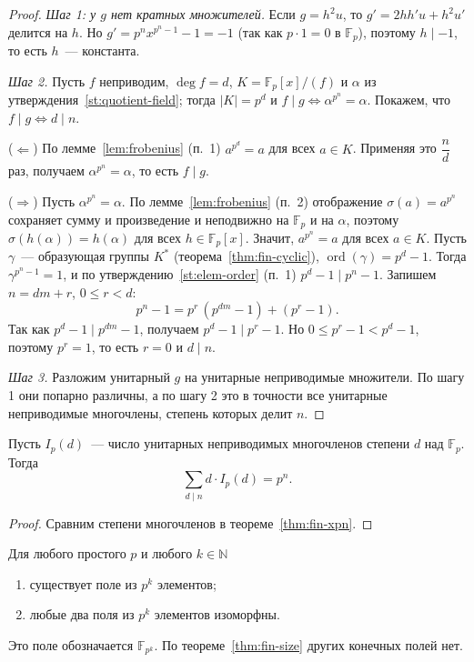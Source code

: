 \documentclass[12pt]{article}
\begin{document}
	\begin{proof}
		\emph{Шаг 1: у $g$ нет кратных множителей.} Если $g = h^2u$, то $g' = 2hh'u + h^2u'$ делится на $h$. Но $g' = p^nx^{p^n - 1} - 1 = -1$ (так как $p \cdot 1 = 0$ в $\mathbb{F}_p$), поэтому $h \mid -1$, то есть $h$~--- константа.

		\emph{Шаг 2.} Пусть $f$ неприводим, $\deg f = d$, $K = \mathbb{F}_p[x]/(f)$ и $\alpha$ из утверждения~\ref{st:quotient-field}; тогда $|K| = p^d$ и $f \mid g \iff \alpha^{p^n} = \alpha$. Покажем, что $f \mid g \iff d \mid n$.

		($\Leftarrow$) По лемме~\ref{lem:frobenius} (п.~1) $a^{p^d} = a$ для всех $a \in K$. Применяя это $\dfrac{n}{d}$ раз, получаем $\alpha^{p^n} = \alpha$, то есть $f \mid g$.

		($\Rightarrow$) Пусть $\alpha^{p^n} = \alpha$. По лемме~\ref{lem:frobenius} (п.~2) отображение $\sigma(a) = a^{p^n}$ сохраняет сумму и произведение и неподвижно на $\mathbb{F}_p$ и на $\alpha$, поэтому $\sigma(h(\alpha)) = h(\alpha)$ для всех $h \in \mathbb{F}_p[x]$. Значит, $a^{p^n} = a$ для всех $a \in K$. Пусть $\gamma$~--- образующая группы $K^*$ (теорема~\ref{thm:fin-cyclic}), $\operatorname{ord}(\gamma) = p^d - 1$. Тогда $\gamma^{p^n - 1} = 1$, и по утверждению~\ref{st:elem-order} (п.~1) $p^d - 1 \mid p^n - 1$. Запишем $n = dm + r$, $0 \leqslant r < d$:
		\[
			p^n - 1 = p^r\,(p^{dm} - 1) + (p^r - 1).
		\]
		Так как $p^d - 1 \mid p^{dm} - 1$, получаем $p^d - 1 \mid p^r - 1$. Но $0 \leqslant p^r - 1 < p^d - 1$, поэтому $p^r = 1$, то есть $r = 0$ и $d \mid n$.

		\emph{Шаг 3.} Разложим унитарный $g$ на унитарные неприводимые множители. По шагу 1 они попарно различны, а по шагу 2 это в точности все унитарные неприводимые многочлены, степень которых делит $n$.
	\end{proof}

	\begin{corollary}\label{cor:fin-count}
		Пусть $I_p(d)$~--- число унитарных неприводимых многочленов степени $d$ над $\mathbb{F}_p$. Тогда
		\[
			\sum_{d \mid n} d \cdot I_p(d) = p^n.
		\]
	\end{corollary}

	\begin{proof}
		Сравним степени многочленов в теореме~\ref{thm:fin-xpn}.
	\end{proof}

	\begin{theorem}\label{thm:fin-exist-unique}
		Для любого простого $p$ и любого $k \in \mathbb{N}$
		\begin{enumerate}
			\item существует поле из $p^k$ элементов;
			\item любые два поля из $p^k$ элементов изоморфны.
		\end{enumerate}
		Это поле обозначается $\mathbb{F}_{p^k}$. По теореме~\ref{thm:fin-size} других конечных полей нет.
	\end{theorem}
\end{document}
